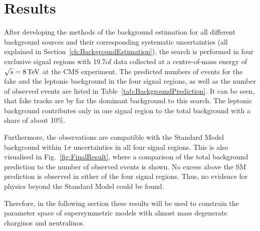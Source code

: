 \FloatBarrier
\chapter{Results}
\label{sec:Results}
After developing the methods of the background estimation for all different background sources and their corresponding systematic uncertainties (all explained in Section~\ref{ch:BackgroundEstimation}), 
the search is performed in four exclusive signal regions with 19.7\fbinv of data collected at a centre-of-mass energy of $\sqrt{s} = 8\,\text{Te}\kern-0.06667em\text{V}$ at the CMS experiment.
The predicted numbers of events for the fake and the leptonic background in the four signal regions, as well as the number of observed events are listed in Table~\ref{tab:BackgroundPrediction}.
It can be seen, that fake tracks are by far the dominant background to this search.
The leptonic background contributes only in one signal region to the total background with a share of about 10\%.

Furthermore, the observations are compatible with the Standard Model background within 1$\sigma$ uncertainties in all four signal regions.
This is also visualised in Fig.~\ref{fig:FinalResult}, where a comparison of the total background prediction to the number of observed events is shown.
No excess above the SM prediction is observed in either of the four signal regions.
Thus, no evidence for physics beyond the Standard Model could be found.

Therefore, in the following section these results will be used to constrain the parameter space of supersymmetric models with almost mass degenerate charginos and neutralinos.

